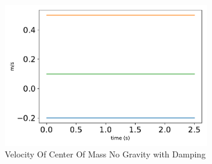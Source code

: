 \begin{figure}[htbp]\centerline{\includegraphics[width=0.8\textwidth]{AutoTeX/VelocityOfCenterOfMassNoGravityDamping}}\caption{Velocity Of Center Of Mass No Gravity with Damping}\label{fig:VelocityOfCenterOfMassNoGravityDamping}\end{figure}
